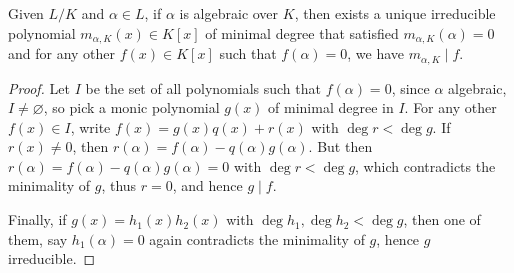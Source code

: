 \begin{prop}
  Given $L/K$ and $\alpha \in L$, if $\alpha$ is algebraic over $K$, then
  exists a unique irreducible polynomial $m_{\alpha, K}(x) \in K[x]$ of minimal degree
  that satisfied $m_{\alpha, K}(\alpha) = 0$ and for any other $f(x) \in K[x]$ such
  that $f(\alpha) = 0$, we have $m_{\alpha, K} \mid f$.

  \begin{proof}

    Let $I$ be the set of all polynomials such that $f(\alpha) = 0$, since $\alpha$ algebraic,
    $I \neq \varnothing$, so pick a monic polynomial $g(x)$ of minimal degree in $I$.
    For any other $f(x) \in I$, write $f(x) = g(x) q(x) + r(x)$ with $\deg r < \deg g$.
    If $r(x) \neq 0$, then $r(\alpha) = f(\alpha) - q(\alpha) g(\alpha)$.
    But then $r(\alpha) = f(\alpha) - q(\alpha) g(\alpha) = 0$ with $\deg r < \deg g$,
    which contradicts the minimality of $g$, thus $r = 0$, and hence $g \mid f$.

    Finally, if $g(x) = h_1(x) h_2(x)$ with $\deg h_1, \deg h_2 < \deg g$,
    then one of them, say $h_1(\alpha) = 0$ again contradicts the minimality of $g$,
    hence $g$ irreducible.
  \end{proof}
\end{prop}

